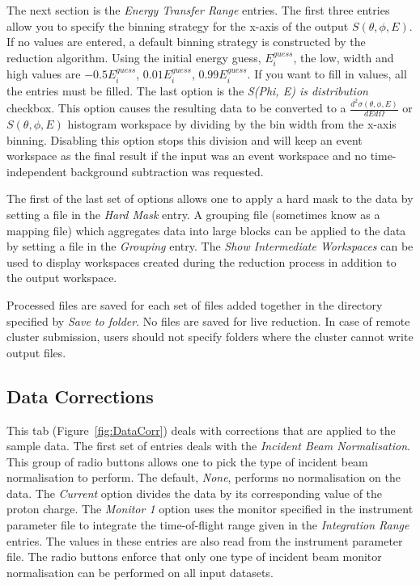 The next section is the \textit{Energy Transfer Range} entries. The first three entries allow you to specify the binning strategy for the x-axis of the output $S(\theta, \phi, E)$. If no values are entered, a default binning strategy is constructed by the reduction algorithm. Using the initial energy guess, $E^{guess}_i$, the low, width and high values are $-0.5E^{guess}_i$, $0.01E^{guess}_i$, $0.99E^{guess}_i$. If you want to fill in values, all the entries must be filled. The last option is the \textit{S(Phi, E) is distribution} checkbox. This option causes the resulting data to be converted to a $\frac{d^2\sigma(\theta,\phi,E)}{dE d\Omega}$ or $S(\theta, \phi, E)$ histogram workspace by dividing by the bin width from the x-axis binning. Disabling this option stops this division and will keep an event workspace as the final result if the input was an event workspace and no time-independent background subtraction was requested. 

The first of the last set of options allows one to apply a hard mask to the data by setting a file in the \textit{Hard Mask} entry. A grouping file (sometimes know as a mapping file) which aggregates data into large blocks can be applied to the data by setting a file in the \textit{Grouping} entry. The \textit{Show Intermediate Workspaces} can be used to display workspaces created during the reduction process in addition to the output workspace. 

Processed \nexus{} files are saved for each set of files added together in the directory specified by \textit{Save to folder}. No files are saved for live reduction. In case of remote cluster submission, users should not specify folders where the cluster cannot write output files.


\subsection{Data Corrections}
This tab (Figure~\ref{fig:DataCorr}) deals with corrections that are applied to the sample data. The first set of entries deals with the \textit{Incident Beam Normalisation}. This group of radio buttons allows one to pick the type of incident beam normalisation to perform. The default, \textit{None}, performs no normalisation on the data. The \textit{Current} option divides the data by its corresponding value of the proton charge. The \textit{Monitor 1} option uses the monitor specified in the instrument parameter file to integrate the time-of-flight range given in the \textit{Integration Range} entries. The values in these entries are also read from the instrument parameter file. The radio buttons enforce that only one type of incident beam monitor normalisation can be performed on all input datasets.

